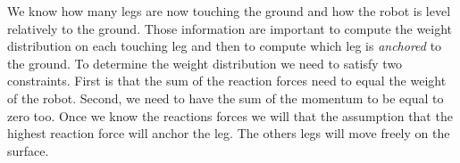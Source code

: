            We know how many legs are now touching the ground and how the robot is level relatively to the ground. Those information are important to compute the weight distribution on each touching leg and then to compute which leg is \textit{anchored} to the ground. To determine the weight distribution we need to satisfy two constraints. First is that the sum of the reaction forces need to equal the weight of the robot. Second, we need to have the sum of the momentum to be equal to zero too. Once we know the reactions forces we will that the assumption that the highest reaction force will anchor the leg. The others legs will move freely on the surface. 
            
            
            